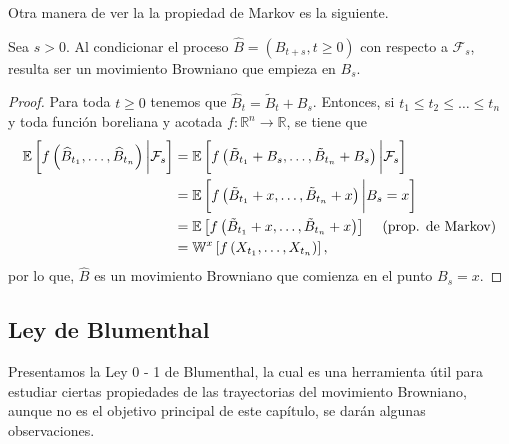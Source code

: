 Otra manera de ver la la propiedad de Markov es la siguiente.

\begin{proposition}
Sea $s > 0$. Al condicionar el proceso $\widehat{B} = (B_{t+s}, t \geq 0)$ con respecto a $\mathcal{F}_s$, resulta ser un movimiento Browniano que empieza en $B_s$.
\begin{proof}
Para toda $t \geq 0$ tenemos que $\widehat{B}_t = \tilde{B}_t + B_s$. Entonces, si $t_1 \leq t_2 \leq \ldots \leq t_n$ y toda función boreliana y acotada $ f : \mathbb{R}^n \rightarrow \mathbb{R}$, se tiene que
	\begin{align*}
	\mathbb{E} \left[ f \left( \widehat{B}_{t_1}, \ldots, \widehat{B}_{t_n} \right) \bigg| \mathcal{F}_s \right] & = \mathbb{E} \left[ f \left( \tilde{B}_{t_1} + B_s, \ldots, \tilde{B}_{t_n} + B_s \right) \bigg| \mathcal{F}_s \right] \\
	& = \mathbb{E} \left[ f \left( \tilde{B}_{t_1} + x, \ldots, \tilde{B}_{t_n} + x \right) \bigg| B_s = x \right] \\
	& = \mathbb{E} \left[ f \left( \tilde{B}_{t_1} + x, \ldots, \tilde{B}_{t_n} + x \right) \right] \hspace{0.3cm} \text{ (prop. de Markov)} \\
	& = \mathbb{W}^x \left[ f \left( X_{t_1}, \ldots, X_{t_n} \right) \right],
	\end{align*}
por lo que, $\widehat{B}$ es un movimiento Browniano que comienza en el punto $B_s = x$.
\end{proof}
\end{proposition}

\subsection{Ley de Blumenthal}
Presentamos la Ley 0 - 1 de Blumenthal, la cual es una herramienta útil para estudiar ciertas propiedades de las trayectorias del movimiento Browniano, aunque no es el objetivo principal de este capítulo, se darán algunas observaciones.

